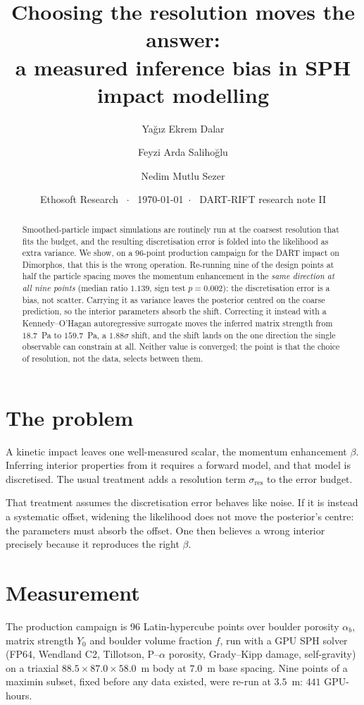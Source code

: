 \documentclass[10pt,twocolumn]{article}
\title{\vspace{-7mm}\textbf{Choosing the resolution moves the answer:\\
a measured inference bias in SPH impact modelling}\vspace{-2mm}}
\author{\normalsize Ya\u{g}{\i}z Ekrem Dalar \and
        \normalsize Feyzi Arda Saliho\u{g}lu \and
        \normalsize Nedim Mutlu Sezer\vspace{-1mm}}
\date{\small Ethosoft Research \ $\cdot$ \ \today \ $\cdot$ \
      DART-RIFT research note II\vspace{-3mm}}
\begin{document}
\maketitle

\begin{abstract}
\noindent
Smoothed-particle impact simulations are routinely run at the coarsest
resolution that fits the budget, and the resulting discretisation error
is folded into the likelihood as extra variance. We show, on a
96-point production campaign for the DART impact on Dimorphos, that
this is the wrong operation. Re-running nine of the design points at
half the particle spacing moves the momentum enhancement in the
\emph{same direction at all nine points} (median ratio $1.139$, sign
test $p = 0.002$): the discretisation error is a bias, not scatter.
Carrying it as variance leaves the posterior centred on the coarse
prediction, so the interior parameters absorb the shift. Correcting it
instead with a Kennedy--O'Hagan autoregressive surrogate moves the
inferred matrix strength from $18.7$~Pa to $159.7$~Pa, a $1.88\sigma$
shift, and the shift lands on the one direction the single observable
can constrain at all. Neither value is converged; the point is that the
choice of resolution, not the data, selects between them.
\end{abstract}

\section{The problem}

A kinetic impact leaves one well-measured scalar, the momentum
enhancement $\beta$. Inferring interior properties from it requires a
forward model, and that model is discretised. The usual treatment adds
a resolution term $\sigma_{\text{res}}$ to the error budget.

That treatment assumes the discretisation error behaves like noise. If
it is instead a systematic offset, widening the likelihood does not
move the posterior's centre: the parameters must absorb the offset.
One then believes a wrong interior precisely because it reproduces the
right $\beta$.

\section{Measurement}

The production campaign is 96 Latin-hypercube points over boulder
porosity $\alpha_b$, matrix strength $Y_0$ and boulder volume fraction
$f$, run with a GPU SPH solver (FP64, Wendland C2, Tillotson,
P--$\alpha$ porosity, Grady--Kipp damage, self-gravity) on a triaxial
$88.5 \times 87.0 \times 58.0$~m body at $7.0$~m base spacing. Nine
points of a maximin subset, fixed before any data existed, were
re-run at $3.5$~m: $441$ GPU-hours.
\end{document}
